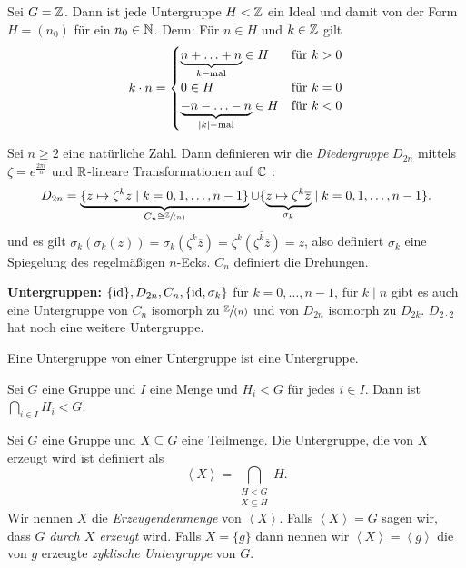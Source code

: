 \begin{eg}
	Sei $G = \mathbb{Z}$. Dann ist jede Untergruppe $H < \mathbb{Z}$ ein Ideal und damit von der Form $H = (n_0)$ für ein $n_0 \in \mathbb{N}$.
	Denn: Für $n \in H$ und $k \in \mathbb{Z}$ gilt 
	\[
		k \cdot n = \begin{cases}
			\underbrace{n + \ldots + n}_{k-\text{mal}} \in H &\text{für } k > 0\\
			0 \in H &\text{für } k = 0\\
			\underbrace{-n - \ldots -n}_{\abs{k}-\text{mal}} \in H &\text{für } k <0
		\end{cases}
	\]
\end{eg}

\begin{eg}
	Sei $n \geq 2$ eine natürliche Zahl.
	Dann definieren wir die \emph{Diedergruppe} $D_{2n}$ mittels $\zeta = e^{\frac{2 \pi i}{n}}$ und $\mathbb{R}$-lineare Transformationen auf $\mathbb{C}$ :
	\[
		D_{2n} = \underbrace{\{z \mapsto \zeta^{k} z \mid k = 0,1,\ldots,n-1\}}_{C_{n} \cong \sfrac{\mathbb{Z}}{(n)}} \cup 
		\{\underbrace{z \mapsto \zeta^{k} \overline{z}}_{\sigma_{k}} \mid k = 0,1,\ldots,n-1\} 
	.\] 
	und es gilt $\sigma_{k}(\sigma_{k}(z)) = \sigma_{k}(\zeta^{k} \overline{z}) = \zeta^{k} \overline{(\zeta^{k} \overline{z})} = z$, also definiert $\sigma_{k}$ eine Spiegelung 
	des regelmäßigen $n$-Ecks. $C_{n}$ definiert die Drehungen.

	\textbf{Untergruppen:} $\{\operatorname{id}\}, D_{2n}, C_{n}, \{\operatorname{id}, \sigma_{k}\}$ für $k = 0,\ldots,n-1$, für $k \mid n$ gibt es auch eine Untergruppe von $C_{n}$ isomorph zu $\sfrac{\mathbb{Z}}{(n)}$ 
	und von $D_{2n}$ isomorph zu $D_{2k}$. $D_{2\cdot 2}$ hat noch eine weitere Untergruppe.
\end{eg}

\begin{lemma}
	Eine Untergruppe von einer Untergruppe ist eine Untergruppe.
\end{lemma}

\begin{lemma}
	Sei $G$ eine Gruppe und $I$ eine Menge und $H_{i} < G$ für jedes $i \in I$.
	Dann ist $\bigcap_{i \in I} H_{i} < G$.
\end{lemma}

\begin{definition}
	Sei $G$ eine Gruppe und $X \subseteq G$ eine Teilmenge. Die Untergruppe, die von $X$ erzeugt wird ist definiert als
	\[
		\left< X \right> = \bigcap_{\substack{H < G\\ X \subseteq H}} H
	.\] 
	Wir nennen $X$ die \emph{Erzeugendenmenge} von $\left< X \right>$. Falls $\left< X \right> = G$ sagen wir, dass $G$ \emph{durch $X$ erzeugt} wird.
	Falls $X = \{g\}$ dann nennen wir $\left< X \right> = \left< g \right>$ die von $g$ erzeugte \emph{zyklische Untergruppe} von $G$. 
\end{definition}

